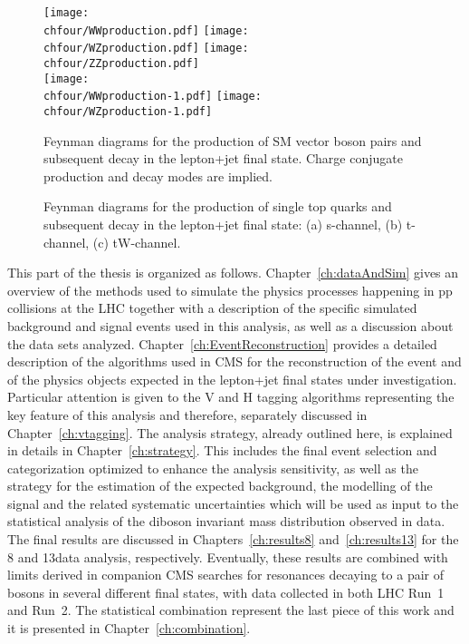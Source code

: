 \begin{figure}[!htb]
\centering
\texttt{[image: \\chfour/WWproduction.pdf]}
\texttt{[image: \\chfour/WZproduction.pdf]}
\texttt{[image: \\chfour/ZZproduction.pdf]}\\
\texttt{[image: \\chfour/WWproduction-1.pdf]}
\texttt{[image: \\chfour/WZproduction-1.pdf]}
\caption{Feynman diagrams for the production of SM vector boson pairs and subsequent decay in the lepton+jet final state. Charge conjugate production and decay modes are implied.}
\label{fig:FDbkgVV}
\end{figure}

\begin{figure}[!htb]
\centering
{}
\caption{Feynman diagrams for the production of single top quarks and subsequent decay in the lepton+jet final state: (a) s-channel, (b) t-channel, (c) tW-channel.}
\label{fig:FDbkgStop}
\end{figure}

This part of the thesis is organized as follows.
Chapter~\ref{ch:dataAndSim} gives an overview of the methods used to simulate the physics processes happening in pp collisions at the LHC
together with a description of the specific simulated background and signal events used in this analysis, as well as a discussion about the data sets analyzed.
Chapter~\ref{ch:EventReconstruction} provides a detailed description of the algorithms used in CMS for the reconstruction of the event and of the physics objects expected in the lepton+jet final states under investigation.
Particular attention is given to the V and H tagging algorithms representing the key feature of this analysis and therefore, separately discussed in Chapter~\ref{ch:vtagging}.
The analysis strategy, already outlined here, is explained in details in Chapter~\ref{ch:strategy}.
This includes the final event selection and categorization optimized to enhance the analysis sensitivity,
as well as the strategy for the estimation of the expected background, the modelling of the signal and the related systematic uncertainties
which will be used as input to the statistical analysis of the diboson invariant mass distribution observed in data.
The final results are discussed in Chapters~\ref{ch:results8} and~\ref{ch:results13} for the 8 and 13\TeV data analysis, respectively. 
Eventually, these results are combined with limits derived in companion CMS searches for resonances decaying to a pair of bosons in several different final states, with data collected in both LHC Run~1 and Run~2.
The statistical combination represent the last piece of this work and it is presented in Chapter~\ref{ch:combination}.